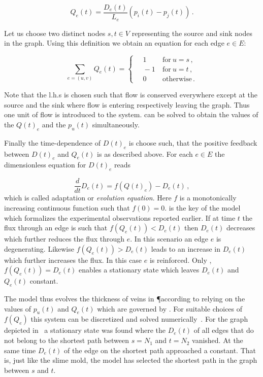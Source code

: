 			\begin{equation}
				Q_e(t) = \frac{D_e(t)}{L_e} (p_i(t) - p_j(t))\,.
				\label{eq:flow}
			\end{equation}

			Let us choose two distinct nodes $s, t \in V$ representing the source and sink nodes in the graph. Using this definition we obtain an equation for each edge $e \in E$:

			\begin{equation}
				\sum_{e = (u,v) } Q_e(t) =
				\begin{cases}
				\quad 1 & \ \text{for} \ u=s\,, \\
				\quad -1 & \ \text{for} \ u=t\,, \\
				\quad 0 & \ \text{otherwise}\,.
				\end{cases}
				\label{eq:conservation_of_flow}
			\end{equation}
			
			Note that the l.h.s is chosen such that flow is conserved everywhere except at the source and the sink where flow is entering respectively leaving the graph. Thus one unit of flow is introduced to the system.  can be solved to obtain the values of the $Q(t)_e$ and the $p_u(t)$ simultaneously.

			Finally the time-dependence of $D(t)_e$ is choose such, that the positive feedback between $D(t)_e$ and $Q_e(t)$ is as described above. For each $e \in E$ the dimensionless equation for $D(t)_e$ reads

			\begin{equation}
				\frac{d}{dt} D_e(t) = f( Q(t)_e ) - D_e(t)\,,
				\label{eq:evolution}
			\end{equation}
			which is called adaptation or \emph{evolution equation}. Here $f$ is a monotonically increasing continuous function such that $f(0) = 0$.  is the key of the model which formalizes the experimental observations reported earlier. If at time $t$ the flux through an edge is such that $f(Q_e(t)) < D_e(t)$ then $D_e(t)$ decreases which further reduces the flux through $e$. In this scenario an edge $e$ is degenerating. Likewise $f(Q_e(t)) > D_e(t)$ leads to an increase in $D_e(t)$ which further increases the flux. In this case $e$ is reinforced. Only ,$f(Q_e(t)) = D_e(t)$ enables a stationary state which leaves $D_e(t)$ and $Q_e(t)$ constant. 

			The model thus evolves the thickness of veins in \P according to  relying on the values of $p_u(t)$ and $Q_e(t)$ which are governed by . For suitable choices of $f(Q_e)$ this system can be discretized and solved numerically~\cite{Tero2006115}. For the graph depicted in~ a stationary state was found where the $D_e(t)$ of all edges that do not belong to the shortest path between $s=N_1$ and $t=N_2$ vanished. At the same time $D_e(t)$ of the edge on the shortest path approached a constant. That is, just like the slime mold, the model has selected the shortest path in the graph between $s$ and $t$. 


